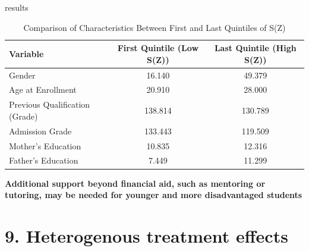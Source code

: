 \documentclass[aspectratio=169]{beamer}
\begin{document}
\begin{frame}{results}
\begin{table}[h]
    \centering
    \begin{tabular}{l c c}
        \hline
        \textbf{Variable} & \textbf{First Quintile (Low S(Z))} & \textbf{Last Quintile (High S(Z))} \\
        \hline
        Gender & 16.140 & 49.379 \\
        Age at Enrollment & 20.910 & 28.000 \\
        Previous Qualification (Grade) & 138.814 & 130.789 \\
        Admission Grade & 133.443 & 119.509 \\
        Mother’s Education & 10.835 & 12.316 \\
        Father’s Education & 7.449 & 11.299 \\
        \hline
    \end{tabular}
    \caption{Comparison of Characteristics Between First and Last Quintiles of S(Z)}
    \label{tab:quintile_comparison_2}
\end{table}



\textbf{Additional support beyond financial aid, such as mentoring or tutoring, may be needed for younger and more disadvantaged students}
\end{frame}







































\section{9. Heterogenous treatment effects}
\end{document}
